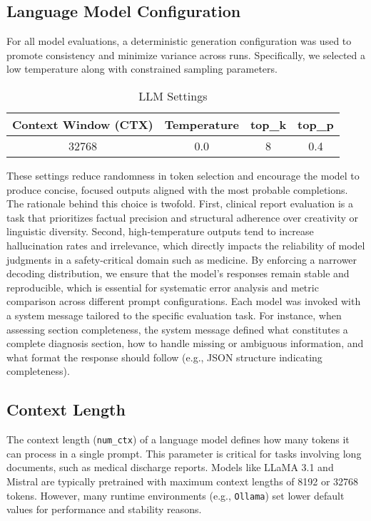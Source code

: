 \clearpage
\subsection{Language Model Configuration}
For all model evaluations, a deterministic generation configuration was used 
to promote consistency and minimize variance across runs. 
Specifically, we selected a low temperature along with constrained sampling
parameters.
\begin{table}[H]
\centering
\label{tab:llm_settings}
\begin{tabular}{c c c c}
\toprule
    \textbf{Context Window (CTX)} & \textbf{Temperature} & \textbf{top\_k} &
    \textbf{top\_p} \\
\midrule
    32768 & 0.0 & 8 & 0.4 \\
\bottomrule
\end{tabular}
\caption{LLM Settings}
\end{table}
These settings reduce randomness in token selection and encourage the 
model to produce concise, focused outputs aligned with the most probable completions.
The rationale behind this choice is twofold. 
First, clinical report evaluation is a task that prioritizes factual precision 
and structural adherence over creativity or linguistic diversity. 
Second, high-temperature outputs tend to increase hallucination rates and irrelevance, 
which directly impacts the reliability of model judgments in a safety-critical 
domain such as medicine.
By enforcing a narrower decoding distribution, we ensure that the model’s responses 
remain stable and reproducible, which is essential for systematic error 
analysis and metric comparison across different prompt configurations.
Each model was invoked with a system message tailored to the specific evaluation task. 
For instance, when assessing section completeness, 
the system message defined what constitutes a complete diagnosis section, 
how to handle missing or ambiguous information, and what format the response 
should follow (e.g., JSON structure indicating completeness).

\subsection{Context Length}
The context length (\texttt{num\_ctx}) of a language model defines how many tokens it can process in a single prompt. This parameter is critical for tasks involving long documents, such as medical discharge reports. Models like LLaMA 3.1 and Mistral are typically pretrained with maximum context lengths of 8192 or 32768 tokens. However, many runtime environments (e.g., \texttt{Ollama}) set lower default values for performance and stability reasons.

